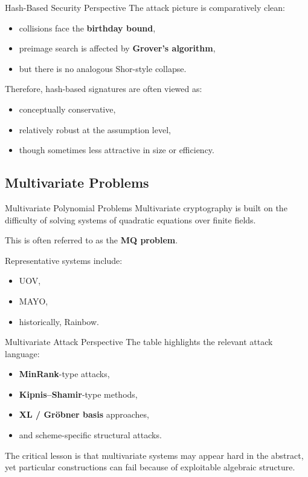 \documentclass[aspectratio=169]{beamer}
\begin{document}
	\begin{frame}{Hash-Based Security Perspective}
		The attack picture is comparatively clean:
		\begin{itemize}
			\item collisions face the \textbf{birthday bound},
			\item preimage search is affected by \textbf{Grover's algorithm},
			\item but there is no analogous Shor-style collapse.
		\end{itemize}
		
		\vspace{0.5em}
		Therefore, hash-based signatures are often viewed as:
		\begin{itemize}
			\item conceptually conservative,
			\item relatively robust at the assumption level,
			\item though sometimes less attractive in size or efficiency.
		\end{itemize}
	\end{frame}
	
	\subsection{Multivariate Problems}
	
	\begin{frame}{Multivariate Polynomial Problems}
		Multivariate cryptography is built on the difficulty of solving systems of quadratic equations over finite fields.
		
		\vspace{0.5em}
		This is often referred to as the \textbf{MQ problem}.
		
		\vspace{0.5em}
		Representative systems include:
		\begin{itemize}
			\item UOV,
			\item MAYO,
			\item historically, Rainbow.
		\end{itemize}
	\end{frame}
	
	\begin{frame}{Multivariate Attack Perspective}
		The table highlights the relevant attack language:
		\begin{itemize}
			\item \textbf{MinRank}-type attacks,
			\item \textbf{Kipnis--Shamir}-type methods,
			\item \textbf{XL / Gr\"obner basis} approaches,
			\item and scheme-specific structural attacks.
		\end{itemize}
		
		\vspace{0.5em}
		The critical lesson is that multivariate systems may appear hard in the abstract, yet particular constructions can fail because of exploitable algebraic structure.
	\end{frame}
	
\end{document}
